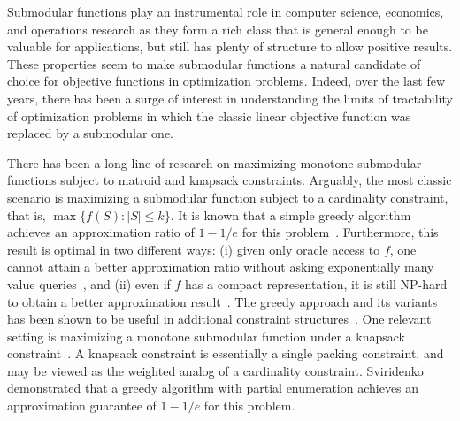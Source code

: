 \documentclass[11pt]{article}
\theoremstyle{plain}
\theoremstyle{definition}
\begin{document}
\medskip {}
Submodular functions play an instrumental role in computer
science, economics, and operations research as they form a rich
class that is general enough to be valuable for applications, but
still has plenty of structure to allow positive results. These
properties seem to make submodular functions a natural candidate
of choice for objective functions in optimization problems.
Indeed, over the last few years, there has been a surge of
interest in understanding the limits of tractability of
optimization problems in which the classic linear objective
function was replaced by a submodular one.

There has been a long line of research on maximizing monotone
submodular functions subject to matroid and knapsack constraints.
Arguably, the most classic scenario is maximizing a submodular
function subject to a cardinality constraint, that is, $\max
\{f(S) : |S| \leq k\}$. It is known that a simple greedy algorithm
achieves an approximation ratio of $1 - 1 /e$ for this
problem~\cite{NemhauserWF78}. Furthermore, this result is optimal
in two different ways: (i) given only oracle access to $f$, one
cannot attain a better approximation ratio without asking
exponentially many value queries~\cite{NemhauserW78}, and (ii)
even if $f$ has a compact representation, it is still NP-hard to
obtain a better approximation result~\cite{Feige98}. The greedy
approach and its variants has been shown to be useful in
additional constraint
structures~\cite{FisherNW78,KhullerMN99,ChekuriK04,GoundanS07}.
One relevant setting is maximizing a monotone submodular function
under a knapsack constraint~\cite{Wolsey82a}. A knapsack
constraint is essentially a single packing constraint, and may be
viewed as the weighted analog of a cardinality constraint.
Sviridenko~\cite{Sviridenko04} demonstrated that a greedy
algorithm with partial enumeration achieves an approximation
guarantee of $1 - 1/e$ for this problem.
\end{document}
